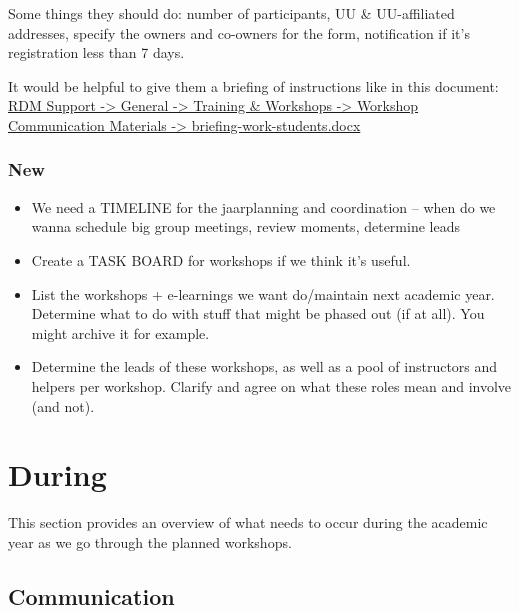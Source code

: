 \documentclass[
  letterpaper,
  DIV=11,
  numbers=noendperiod]{scrreprt}
\providecommand{\tightlist}{%
  \setlength{\itemsep}{0pt}\setlength{\parskip}{0pt}}\usepackage{longtable,booktabs,array}
\begin{document}
Some things they should do: number of participants, UU \& UU-affiliated
addresses, specify the owners and co-owners for the form, notification
if it's registration less than 7 days.

It would be helpful to give them a briefing of instructions like in this
document:
\href{https://solisservices.sharepoint.com/:w:/r/sites/RDMSpeeltuin/Shared\%20Documents/General/Trainings\%20and\%20Workshops/Workshop\%20Communication\%20Materials/briefing-work-students\%20.docx?d=wd1d0b1b5d61e432699f668dfe89ae60f&csf=1&web=1&e=iVl4Iz}{RDM
Support -\textgreater{} General -\textgreater{} Training \& Workshops
-\textgreater{} Workshop Communication Materials -\textgreater{}
briefing-work-students.docx}

\subsection*{New}\label{new}

\begin{itemize}
\tightlist
\item
  We need a TIMELINE for the jaarplanning and coordination -- when do we
  wanna schedule big group meetings, review moments, determine leads 🎉
\item
  Create a TASK BOARD for workshops if we think it's useful.
\item
  List the workshops + e-learnings we want do/maintain next academic
  year. Determine what to do with stuff that might be phased out (if at
  all). You might archive it for example.
\item
  Determine the leads of these workshops, as well as a pool of
  instructors and helpers per workshop. Clarify and agree on what these
  roles mean and involve (and not).
\end{itemize}

\chapter*{During}\label{during}


This section provides an overview of what needs to occur during the
academic year as we go through the planned workshops.

\section*{Communication}\label{communication}
\end{document}
